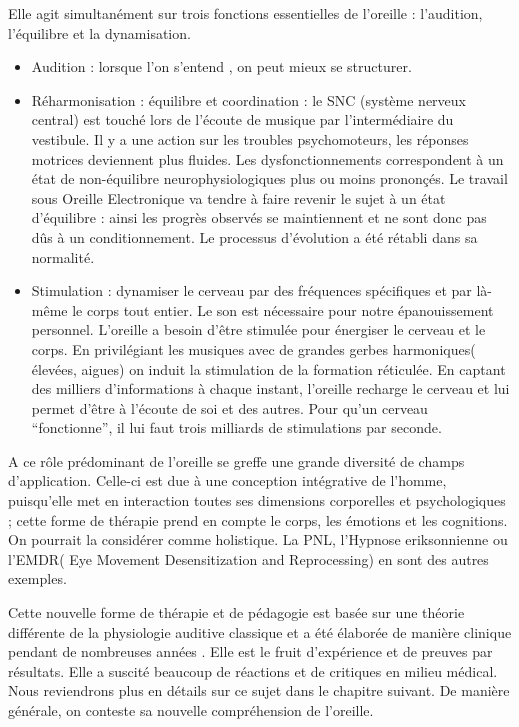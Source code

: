 \documentclass[12pt,french]{report}
\begin{document}
Elle agit simultanément sur trois fonctions essentielles de l'oreille
: l'audition, l'équilibre et la dynamisation.
\begin{itemize}
\item Audition : lorsque l'on s'entend , on peut mieux se structurer.
\item Réharmonisation : équilibre et coordination : le SNC (système nerveux
central) est touché lors de l'écoute de musique par l'intermédiaire
du vestibule. Il y a une action sur les troubles psychomoteurs, les
réponses motrices deviennent plus fluides. Les dysfonctionnements
correspondent à un état de non-équilibre neurophysiologiques plus
ou moins prononçés. Le travail sous Oreille Electronique va tendre
à faire revenir le sujet à un état d'équilibre : ainsi les progrès
observés se maintiennent et ne sont donc pas dûs à un conditionnement.
Le processus d'évolution a été rétabli dans sa normalité.
\item Stimulation : dynamiser le cerveau par des fréquences spécifiques
et par là-même le corps tout entier. Le son est nécessaire pour notre
épanouissement personnel. L'oreille a besoin d'être stimulée pour
énergiser le cerveau et le corps. En privilégiant les musiques avec
de grandes gerbes harmoniques( élevées, aigues) on induit la stimulation
de la formation réticulée. En captant des milliers d'informations
à chaque instant, l'oreille recharge le cerveau et lui permet d'être
à l'écoute de soi et des autres. Pour qu'un cerveau ``fonctionne'',
il lui faut trois milliards de stimulations par seconde.
\end{itemize}
A ce rôle prédominant de l'oreille se greffe une grande diversité
de champs d'application. Celle-ci est due à une conception intégrative
de l'homme, puisqu'elle met en interaction toutes ses dimensions corporelles
et psychologiques ; cette forme de thérapie prend en compte le corps,
les émotions et les cognitions. On pourrait la considérer comme holistique.
La PNL, l'Hypnose eriksonnienne ou l'EMDR( Eye Movement Desensitization
and Reprocessing) en sont des autres exemples. 

Cette nouvelle forme de thérapie et de pédagogie est basée sur une
théorie différente de la physiologie auditive classique et a été élaborée
de manière clinique pendant de nombreuses années . Elle est le fruit
d'expérience et de preuves par résultats. Elle a suscité beaucoup
de réactions et de critiques en milieu médical. Nous reviendrons plus
en détails sur ce sujet dans le chapitre suivant. De manière générale,
on conteste sa nouvelle compréhension de l'oreille.
\end{document}
